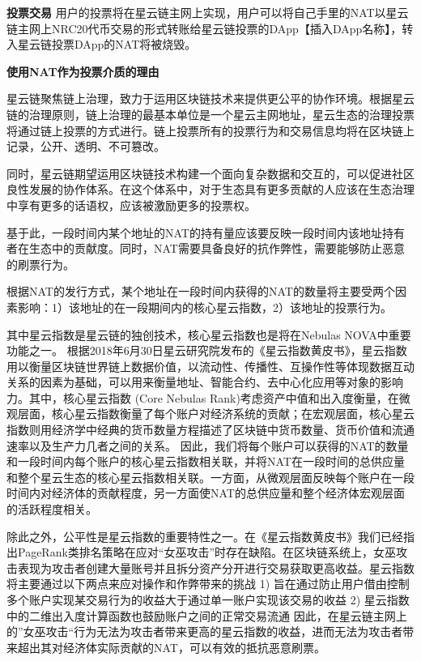 \textbf{投票交易}
用户的投票将在星云链主网上实现，用户可以将自己手里的NAT以星云链主网上NRC20代币交易的形式转账给星云链投票的DApp【插入DApp名称】，转入星云链投票DApp的NAT将被烧毁。

\textbf{使用NAT作为投票介质的理由}

星云链聚焦链上治理，致力于运用区块链技术来提供更公平的协作环境。根据星云链的治理原则，链上治理的最基本单位是一个星云主网地址，星云生态的治理投票将通过链上投票的方式进行。链上投票所有的投票行为和交易信息均将在区块链上记录，公开、透明、不可篡改。

同时，星云链期望运用区块链技术构建一个面向复杂数据和交互的，可以促进社区良性发展的协作体系。在这个体系中，对于生态具有更多贡献的人应该在生态治理中享有更多的话语权，应该被激励更多的投票权。

基于此，一段时间内某个地址的NAT的持有量应该要反映一段时间内该地址持有者在生态中的贡献度。同时，NAT需要具备良好的抗作弊性，需要能够防止恶意的刷票行为。


根据NAT的发行方式，某个地址在一段时间内获得的NAT的数量将主要受两个因素影响：1）该地址的在一段期间内的核心星云指数，2）该地址的投票行为。


其中星云指数是星云链的独创技术，核心星云指数也是将在Nebulas NOVA中重要功能之一。
根据2018年6月30日星云研究院发布的《星云指数黄皮书》，星云指数用以衡量区块链世界链上数据价值，以流动性、传播性、互操作性等体现数据互动关系的因素为基础，可以用来衡量地址、智能合约、去中心化应用等对象的影响力。其中，核心星云指数
(Core Nebulas Rank)考虑资产中值和出入度衡量，在微观层面，核心星云指数衡量了每个账户对经济系统的贡献；在宏观层面，核心星云指数则用经济学中经典的货币数量方程描述了区块链中货币数量、货币价值和流通速率以及生产力几者之间的关系。
因此，我们将每个账户可以获得的NAT的数量和一段时间内每个账户的核心星云指数相关联，并将NAT在一段时间的总供应量和整个星云生态的核心星云指数相关联。一方面，从微观层面反映每个账户在一段时间内对经济体的贡献程度，另一方面使NAT的总供应量和整个经济体宏观层面的活跃程度相关。

除此之外，公平性是星云指数的重要特性之一。在《星云指数黄皮书》我们已经指出PageRank类排名策略在应对“女巫攻击”时存在缺陷。在区块链系统上，女巫攻击表现为攻击者创建大量账号并且拆分资产分开进行交易获取更高收益。星云指数将主要通过以下两点来应对操作和作弊带来的挑战
1)	旨在通过防止用户借由控制多个账户实现某交易行为的收益大于通过单一账户实现该交易的收益
2)	星云指数中的二维出入度计算函数也鼓励账户之间的正常交易流通
因此，在星云链主网上的”女巫攻击“行为无法为攻击者带来更高的星云指数的收益，进而无法为攻击者带来超出其对经济体实际贡献的NAT，可以有效的抵抗恶意刷票。

